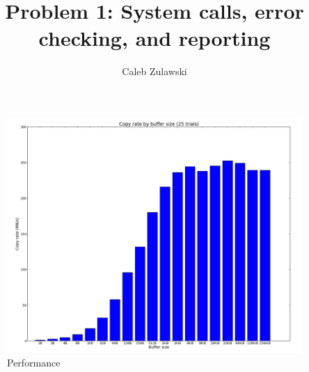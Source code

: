 \documentclass{article}
\begin{document}
\title{Problem 1: System calls, error checking, and reporting}
\author{Caleb Zulawski}

\maketitle

\begin{figure}
    \centering
    \includegraphics[width=\linewidth]{../test/results}
    \caption{Performance}
    \label{performancefig}
\end{figure}








\end{document}
